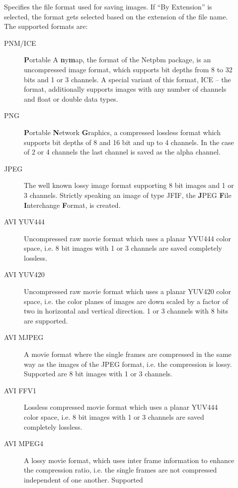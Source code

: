 \begin{description}
\item[] Specifies the file format used for saving
  images. If ``By Extension'' is selected, the format gets selected
  based on the extension of the file name. The supported formats
  are: \label{page:gui_image_format}
  \begin{description}
  \item[PNM/ICE] {\bf P}ortable A{\bf
    n}y{\bf m}ap, the format of the Netpbm package, is an
    uncompressed image format, which supports bit depths from 8 to
    32 bits and 1 or 3 channels. A special variant of this format,
    ICE -- the \icewing{} format, additionally supports images with
    any number of channels and float or double data types.
  \item[PNG] {\bf P}ortable {\bf N}etwork
    {\bf G}raphics, a compressed lossless format which supports bit
    depths of 8 and 16 bit and up to 4 channels. In the case of 2 or
    4 channels the last channel is saved as the alpha channel.
  \item[JPEG] The well known lossy image
    format supporting 8 bit images and 1 or 3 channels. Strictly
    speaking an image of type JFIF, the {\bf J}PEG {\bf F}ile {\bf
      I}nterchange {\bf F}ormat, is created. 
  \item[AVI YUV444] Uncompressed raw movie
    format which uses a planar YVU444 color space, i.e. 8 bit images
    with 1 or 3 channels are saved completely lossless.
  \item[AVI YUV420] Uncompressed raw movie format which uses a planar
    YUV420 color space, i.e. the color planes of images are down
    scaled by a factor of two in horizontal and vertical direction.
    1 or 3 channels with 8 bits are supported.
  \item[AVI MJPEG] A movie format where the single frames are
    compressed in the same way as the images of the JPEG
    format, i.e. the compression is lossy. Supported are 8 bit
    images with 1 or 3 channels.
  \item[AVI FFV1] Lossless compressed movie format which uses a
    planar YUV444 color space, i.e. 8 bit images with 1 or 3
    channels are saved completely lossless.
  \item[AVI MPEG4] A lossy movie format, which uses inter frame
    information to enhance the compression ratio, i.e. the single
    frames are not compressed independent of one another. Supported

\end{description}
\end{description}
